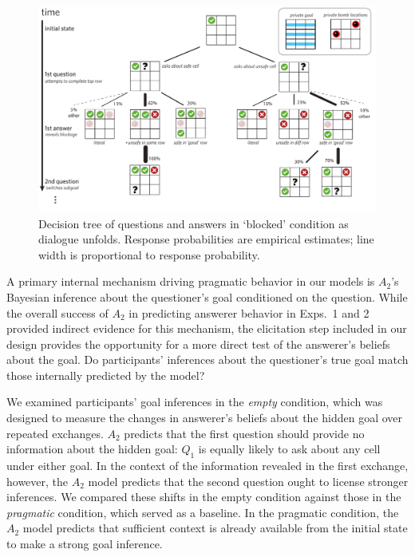 \documentclass[11pt, floatsintext]{apa6}
\begin{document}
\begin{figure}[t!]
\begin{center}
\includegraphics[scale = .6]{Exp3/blocked.pdf}
\end{center}
\caption{Decision tree of questions and answers in `blocked' condition as dialogue unfolds. Response probabilities are empirical estimates; line width is proportional to response probability.}
\label{fig:blocked}
\end{figure}


A primary internal mechanism driving pragmatic behavior in our models is $A_2$'s Bayesian inference about the questioner's goal conditioned on the question. 
While the overall success of $A_2$ in predicting answerer behavior in Exps.~1 and 2 provided indirect evidence for this mechanism, the elicitation step included in our design provides the opportunity for a more direct test of the answerer's beliefs about the goal.
Do participants' inferences about the questioner's true goal match those internally predicted by the model?

We examined participants' goal inferences in the \emph{empty} condition, which was designed to measure the changes in answerer's beliefs about the hidden goal over repeated exchanges. 
$A_2$ predicts that the first question should provide no information about the hidden goal: $Q_1$ is equally likely to ask about any cell under either goal.
In the context of the information revealed in the first exchange, however, the $A_2$ model predicts that the second question ought to license stronger inferences.
We compared these shifts in the empty condition against those in the \emph{pragmatic} condition, which served as a baseline.
In the pragmatic condition, the $A_2$ model predicts that sufficient context is already available from the initial state to make a strong goal inference.
\end{document}
